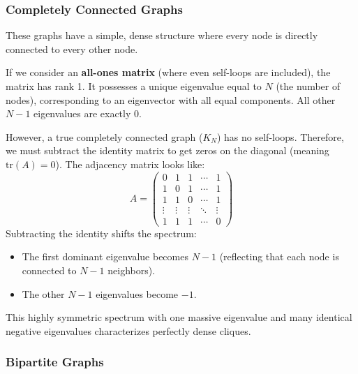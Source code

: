 \subsubsection{Completely Connected Graphs}

These graphs have a simple, dense structure where every node is directly connected to every other node.

If we consider an \textbf{all-ones matrix} (where even self-loops are included), the matrix has rank 1. It possesses a unique eigenvalue equal to $N$ (the number of nodes), corresponding to an eigenvector with all equal components. All other $N-1$ eigenvalues are exactly $0$.

However, a true completely connected graph ($K_N$) has no self-loops. Therefore, we must subtract the identity matrix to get zeros on the diagonal (meaning $\text{tr}(A) = 0$). The adjacency matrix looks like:
\[
    A = \begin{pmatrix}
        0      & 1      & 1      & \cdots & 1      \\
        1      & 0      & 1      & \cdots & 1      \\
        1      & 1      & 0      & \cdots & 1      \\
        \vdots & \vdots & \vdots & \ddots & \vdots \\
        1      & 1      & 1      & \cdots & 0
    \end{pmatrix}
\]
Subtracting the identity shifts the spectrum:
\begin{itemize}
    \item The first dominant eigenvalue becomes $N-1$ (reflecting that each node is connected to $N-1$ neighbors).
    \item The other $N-1$ eigenvalues become $-1$.
\end{itemize}
This highly symmetric spectrum with one massive eigenvalue and many identical negative eigenvalues characterizes perfectly dense cliques.

\subsubsection{Bipartite Graphs}

